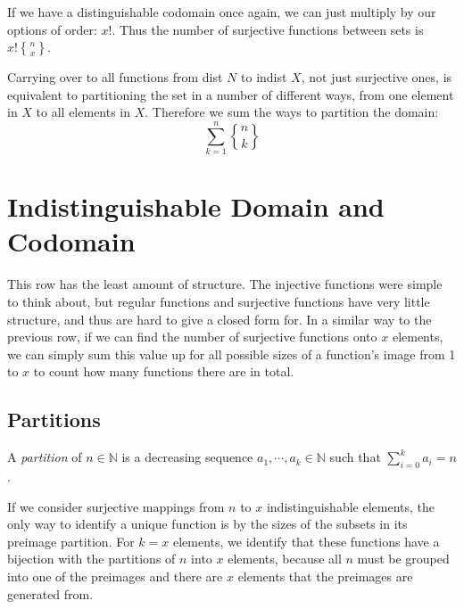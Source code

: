 \documentclass{article}
\begin{document}
If we have a distinguishable codomain once again, we can just multiply by our options of order: $x!$. Thus the
number of surjective functions between sets is $x! {n \brace x}$. \vspace*{0.5em}

Carrying over to all functions from dist $N$ to indist $X$, not just surjective ones, is equivalent to partitioning the set
in a number of different ways, from one element in $X$ to all elements in $X$. Therefore we sum the ways to partition the domain:
\[\sum^n_{k=1} {n \brace k}\]


\section{Indistinguishable Domain and Codomain}

This row has the least amount of structure. The injective functions were simple to think about,
but regular functions and surjective functions have very little structure, and thus are hard
to give a closed form for. In a similar way to the previous row, if we can find the number
of surjective functions onto $x$ elements, we can simply sum this value up for all possible sizes
of a function's image from 1 to $x$ to count how many functions there are in total.
\vspace{1em}
\subsection{Partitions}
A \emph{partition} of $n \in \mathbb{N}$ is a decreasing sequence $a_1, \cdots, a_k \in \mathbb{N}$
such that $\sum^k_{i=0} a_i = n$.

\vspace{1em}
If we consider surjective mappings from $n$ to $x$ indistinguishable elements, the only way to
identify a unique function is by the sizes of the subsets in its preimage partition. For $k=x$ elements, we identify
that these functions have a bijection with the partitions of $n$ into $x$ elements, because all $n$ must
be grouped into one of the preimages and there are $x$ elements that the preimages are generated from.
\end{document}
